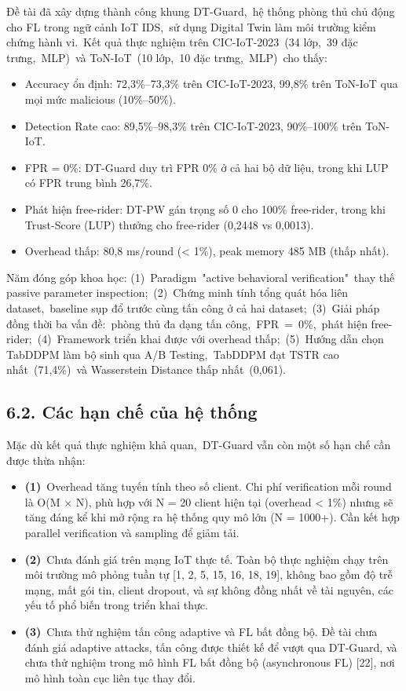Đề tài đã xây dựng thành công khung DT-Guard,~hệ thống phòng thủ chủ động cho FL trong ngữ cảnh IoT IDS,~sử dụng Digital Twin làm môi trường kiểm chứng hành vi.~Kết quả thực nghiệm trên CIC-IoT-2023~(34 lớp,~39 đặc trưng,~MLP)~và ToN-IoT~(10 lớp,~10 đặc trưng,~MLP)~cho thấy:

\begin{itemize}
\item
  Accuracy ổn định: 72,3\%--73,3\% trên CIC-IoT-2023, 99,8\% trên ToN-IoT qua mọi mức malicious (10\%--50\%).
\item
  Detection Rate cao: 89,5\%--98,3\% trên CIC-IoT-2023, 90\%--100\% trên ToN-IoT.
\item
  FPR = 0\%: DT-Guard duy trì FPR 0\% ở cả hai bộ dữ liệu, trong khi LUP có FPR trung bình 26,7\%.
\item
  Phát hiện free-rider: DT-PW gán trọng số 0 cho 100\% free-rider, trong khi Trust-Score (LUP) thưởng cho free-rider (0,2448 vs 0,0013).
\item
  Overhead thấp: 80,8 ms/round (\textless{} 1\%), peak memory 485 MB (thấp nhất).
\end{itemize}

Năm đóng góp khoa học: (1)~Paradigm~"active behavioral verification"~thay thế passive parameter inspection;~(2)~Chứng minh tính tổng quát hóa liên dataset,~baseline sụp đổ trước cùng tấn công ở cả hai dataset;~(3)~Giải pháp đồng thời ba vấn đề:~phòng thủ đa dạng tấn công,~FPR~=~0\%,~phát hiện free-rider;~(4)~Framework triển khai được với overhead thấp;~(5)~Hướng dẫn chọn TabDDPM làm bộ sinh qua A/B Testing,~TabDDPM đạt TSTR cao nhất~(71,4\%)~và Wasserstein Distance thấp nhất~(0,061).

\subsection{6.2. Các hạn chế của hệ thống}\label{cuxe1c-hux1ea1n-chux1ebf-cux1ee7a-hux1ec7-thux1ed1ng}

Mặc dù kết quả thực nghiệm khả quan,~DT-Guard vẫn còn một số hạn chế cần được thừa nhận:

\begin{itemize}
\item
  \textbf{(1)}~Overhead tăng tuyến tính theo số client. Chi phí verification mỗi round là O(M × N), phù hợp với N = 20 client hiện tại (overhead \textless{} 1\%) nhưng sẽ tăng đáng kể khi mở rộng ra hệ thống quy mô lớn (N = 1000+). Cần kết hợp parallel verification và sampling để giảm tải.
\item
  \textbf{(2)}~Chưa đánh giá trên mạng IoT thực tế. Toàn bộ thực nghiệm chạy trên môi trường mô phỏng tuần tự {[}1, 2, 5, 15, 16, 18, 19{]}, không bao gồm độ trễ mạng, mất gói tin, client dropout, và sự không đồng nhất về tài nguyên, các yếu tố phổ biến trong triển khai thực.
\item
  \textbf{(3)}~Chưa thử nghiệm tấn công adaptive và FL bất đồng bộ. Đề tài chưa đánh giá adaptive attacks, tấn công được thiết kế để vượt qua DT-Guard, và chưa thử nghiệm trong mô hình FL bất đồng bộ (asynchronous FL) {[}22{]}, nơi mô hình toàn cục liên tục thay đổi.
\end{itemize}

